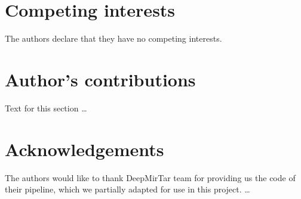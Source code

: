 \documentclass{bmcart}
\begin{document}

\begin{backmatter}

\section*{Competing interests}
  The authors declare that they have no competing interests.

\section*{Author's contributions}
    Text for this section \ldots

\section*{Acknowledgements}
  The authors would like to thank DeepMirTar team for providing us the code of their pipeline, which we partially adapted for use in this project.
 \ldots



\end{backmatter}
\end{document}
